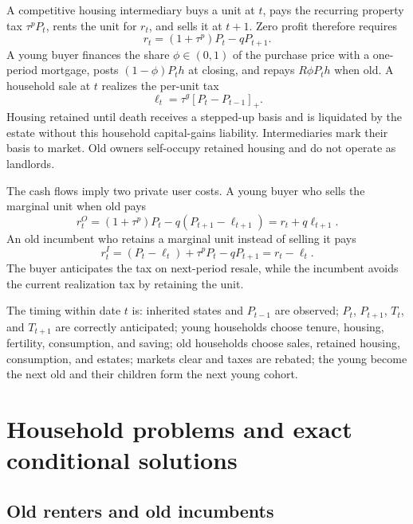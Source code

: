 \documentclass[11pt]{article}
\theoremstyle{definition}
\theoremstyle{remark}
\begin{document}
A competitive housing intermediary buys a unit at $t$, pays the recurring
property tax $\tau^pP_t$, rents the unit for $r_t$, and sells it at $t+1$.
Zero profit therefore requires
\begin{equation}
 r_t=(1+\tau^p)P_t-qP_{t+1}.
 \label{eq:rent_app}
\end{equation}
A young buyer finances the share $\phi\in(0,1)$ of the purchase price with a
one-period mortgage, posts $(1-\phi)P_th$ at closing, and repays $R\phi P_th$
when old.  A household sale at $t$ realizes the per-unit tax
\begin{equation}
 \ell_t=\tau^g[P_t-P_{t-1}]_+.
 \label{eq:gains_app}
\end{equation}
Housing retained until death receives a stepped-up basis and is liquidated by
the estate without this household capital-gains liability.  Intermediaries
mark their basis to market.  Old owners self-occupy retained housing and do not
operate as landlords.

The cash flows imply two private user costs.  A young buyer who sells the
marginal unit when old pays
\begin{equation}
 r_t^O=(1+\tau^p)P_t-q(P_{t+1}-\ell_{t+1})
      =r_t+q\ell_{t+1}.
 \label{eq:buyer_cost_app}
\end{equation}
An old incumbent who retains a marginal unit instead of selling it pays
\begin{equation}
 r_t^I=(P_t-\ell_t)+\tau^pP_t-qP_{t+1}
      =r_t-\ell_t.
 \label{eq:incumbent_cost_app}
\end{equation}
The buyer anticipates the tax on next-period resale, while the incumbent avoids
the current realization tax by retaining the unit.

The timing within date $t$ is: inherited states and $P_{t-1}$ are observed;
$P_t$, $P_{t+1}$, $T_t$, and $T_{t+1}$ are correctly anticipated; young
households choose tenure, housing, fertility, consumption, and saving; old
households choose sales, retained housing, consumption, and estates; markets
clear and taxes are rebated; the young become the next old and their children
form the next young cohort.

\section{Household problems and exact conditional solutions}

\subsection{Old renters and old incumbents}
\end{document}
